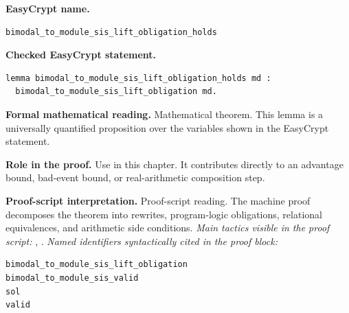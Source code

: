 \begin{formaltheorem}
\noindent\textbf{EasyCrypt name.}
\begin{lstlisting}[language=EasyCrypt,basicstyle=\ttfamily\scriptsize]
bimodal_to_module_sis_lift_obligation_holds
\end{lstlisting}
\noindent\textbf{Checked EasyCrypt statement.}
\begin{lstlisting}[language=EasyCrypt,basicstyle=\ttfamily\scriptsize]
lemma bimodal_to_module_sis_lift_obligation_holds md :
  bimodal_to_module_sis_lift_obligation md.
\end{lstlisting}
\noindent\textbf{Formal mathematical reading.}
Mathematical theorem. This lemma is a universally quantified proposition over the variables shown in the EasyCrypt statement.

\noindent\textbf{Role in the proof.}
Use in this chapter. It contributes directly to an advantage bound, bad-event bound, or real-arithmetic composition step.

\noindent\textbf{Proof-script interpretation.}
Proof-script reading. The machine proof decomposes the theorem into rewrites, program-logic obligations, relational equivalences, and arithmetic side conditions.
\emph{Main tactics visible in the proof script:} , .
\emph{Named identifiers syntactically cited in the proof block:}
\begin{lstlisting}[language=EasyCrypt,basicstyle=\ttfamily\scriptsize]
bimodal_to_module_sis_lift_obligation
bimodal_to_module_sis_valid
sol
valid
\end{lstlisting}

\end{formaltheorem}

